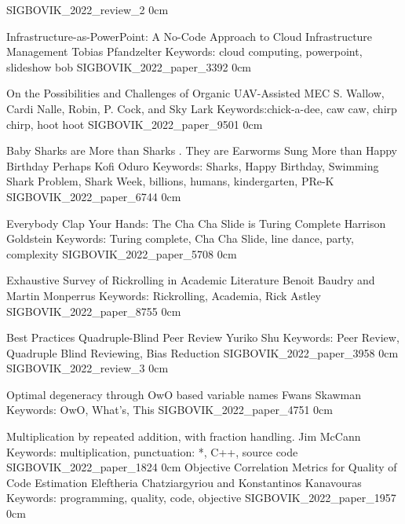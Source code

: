 \addreview
    {SIGBOVIK_2022_review_2}
    {0cm}


\addpaper
    {Infrastructure-as-PowerPoint: A No-Code Approach to Cloud Infrastructure Management}
    {Tobias Pfandzelter}
    {Keywords: cloud computing, powerpoint, slideshow bob}
    {SIGBOVIK_2022_paper_3392}
    {0cm}
    {}

\addpaper
    {On the Possibilities and Challenges of Organic UAV-Assisted MEC}
    {S. Wallow, Cardi Nalle, Robin, P. Cock, and Sky Lark}
    {Keywords:chick-a-dee, caw caw, chirp chirp, hoot hoot}
    {SIGBOVIK_2022_paper_9501}
    {0cm}
    {}


\addpaper
    {Baby Sharks are More than Sharks . They are Earworms Sung More than Happy Birthday Perhaps}
    {Kofi Oduro}
    {Keywords: Sharks, Happy Birthday, Swimming Shark Problem, Shark Week, billions, humans, kindergarten, PRe-K}
    {SIGBOVIK_2022_paper_6744}
    {0cm}
    {}



\addpaper
    {Everybody Clap Your Hands: The Cha Cha Slide is Turing Complete}
    {Harrison Goldstein}
    {Keywords: Turing complete, Cha Cha Slide, line dance, party, complexity}
    {SIGBOVIK_2022_paper_5708}
    {0cm}
    {}



\addpaper
    {Exhaustive Survey of Rickrolling in Academic Literature}
    {Benoit Baudry and Martin Monperrus}
    {Keywords: Rickrolling, Academia, Rick Astley}
    {SIGBOVIK_2022_paper_8755}
    {0cm}
    {}

\addtrack
    {}{Best Practices}
\addpaper
    {Quadruple-Blind Peer Review}
    {Yuriko Shu}
    {Keywords: Peer Review, Quadruple Blind Reviewing, Bias Reduction}
    {SIGBOVIK_2022_paper_3958}
    {0cm}
    {}
\addreview
    {SIGBOVIK_2022_review_3}
    {0cm}

\addpaper
    {Optimal degeneracy through OwO based variable names}
    {Fwans Skawman}
    {Keywords: OwO, What's, This}
    {SIGBOVIK_2022_paper_4751}
    {0cm}
    {}

\addpaper
    {Multiplication by repeated addition, with fraction handling.}
    {Jim McCann}
    {Keywords: multiplication, punctuation: *, C++, source code}
    {SIGBOVIK_2022_paper_1824}
    {0cm}
    {}
\addpaper
    {Objective Correlation Metrics for Quality of Code Estimation}
    {Eleftheria Chatziargyriou and Konstantinos Kanavouras}
    {Keywords: programming, quality, code, objective}
    {SIGBOVIK_2022_paper_1957}
    {0cm}
    {}


